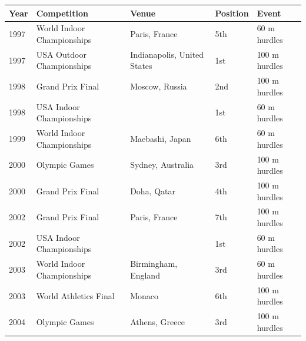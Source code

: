 \documentclass{article}
\begin{document}
\begin{tabular}{lllll}
\toprule
Year & Competition & Venue & Position & Event \\
\midrule
1997 & World Indoor Championships & Paris, France & 5th & 60 m hurdles \\
1997 & USA Outdoor Championships & Indianapolis, United States & 1st & 100 m hurdles \\
1998 & Grand Prix Final & Moscow, Russia & 2nd & 100 m hurdles \\
1998 & USA Indoor Championships &  & 1st & 60 m hurdles \\
1999 & World Indoor Championships & Maebashi, Japan & 6th & 60 m hurdles \\
2000 & Olympic Games & Sydney, Australia & 3rd & 100 m hurdles \\
2000 & Grand Prix Final & Doha, Qatar & 4th & 100 m hurdles \\
2002 & Grand Prix Final & Paris, France & 7th & 100 m hurdles \\
2002 & USA Indoor Championships &  & 1st & 60 m hurdles \\
2003 & World Indoor Championships & Birmingham, England & 3rd & 60 m hurdles \\
2003 & World Athletics Final & Monaco & 6th & 100 m hurdles \\
2004 & Olympic Games & Athens, Greece & 3rd & 100 m hurdles \\
\bottomrule
\end{tabular}
\end{document}
